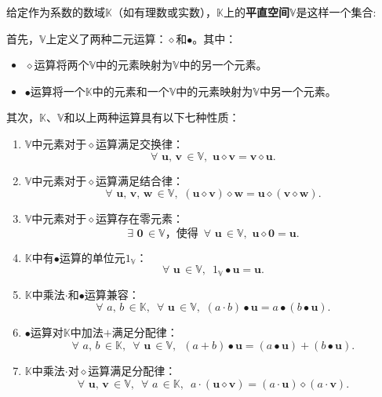 \documentclass[12pt,UTF8]{ctexbook}
\begin{document}
\begin{df}
    给定作为系数的数域$\mathbb{K}$（如有理数或实数），$\mathbb{K}$上的\textbf{平直空间}$\mathbb{V}$是这样一个集合:

    首先，$\mathbb{V}$上定义了两种二元运算：$\diamond$和$\bullet$。其中：
    \begin{itemize}
        \item $\diamond$运算将两个$\mathbb{V}$中的元素映射为$\mathbb{V}$中的另一个元素。
        \item $\bullet$运算将一个$\mathbb{K}$中的元素和一个$\mathbb{V}$中的元素映射为$\mathbb{V}$中另一个元素。
    \end{itemize}
    其次，$\mathbb{K}$、$\mathbb{V}$和以上两种运算具有以下七种性质：
    \begin{enumerate}
        \item $\mathbb{V}$中元素对于$\diamond$运算满足交换律：
        $$\forall \,\, \mathbf{u}, \, \mathbf{v} \, \in \mathbb{V}, \,\, \mathbf{u} \diamond \mathbf{v} = \mathbf{v} \diamond \mathbf{u}.$$
        \item $\mathbb{V}$中元素对于$\diamond$运算满足结合律：
        $$\forall \,\, \mathbf{u}, \, \mathbf{v}, \, \mathbf{w} \, \in \mathbb{V}, \,\, (\mathbf{u} \diamond \mathbf{v}) \diamond \mathbf{w} = \mathbf{u} \diamond (\mathbf{v} \diamond \mathbf{w}).$$
        \item $\mathbb{V}$中元素对于$\diamond$运算存在零元素：
        $$\exists \,\, \mathbf{0} \, \in \mathbb{V} \mbox{，使得}\,\,\, \forall \,\, \mathbf{u} \, \in \mathbb{V}, \,\, \mathbf{u} \diamond \mathbf{0} = \mathbf{u}.$$
        \item $\mathbb{K}$中有$\bullet$运算的单位元$1_{\mathbb{V}}$：
        $$\forall \,\, \mathbf{u} \, \in \mathbb{V}, \,\,\, 1_{\mathbb{V}} \bullet \mathbf{u} = \mathbf{u}. $$
        \item $\mathbb{K}$中乘法$\cdot$和$\bullet$运算兼容：
        $$\forall \,\, a, \, b \, \in \mathbb{K}, \,\,\, \forall \,\, \mathbf{u} \, \in \mathbb{V}, \,\, (a \cdot b)\bullet\mathbf{u} = a \bullet (b\bullet\mathbf{u}).$$
        \item $\bullet$运算对$\mathbb{K}$中加法$+$满足分配律：
        $$\forall \,\, a, \, b \, \in \mathbb{K}, \,\,\, \forall \,\, \mathbf{u} \, \in \mathbb{V}, \,\,\, (a + b)\bullet\mathbf{u} = (a \bullet \mathbf{u}) + (b \bullet \mathbf{u}). $$
        \item $\mathbb{K}$中乘法$\cdot$对$\diamond$运算满足分配律：
        $$\forall \,\, \mathbf{u}, \, \mathbf{v} \, \in \mathbb{V}, \,\,\, \forall \,\, a \, \in \mathbb{K}, \,\,\, a\cdot(\mathbf{u} \diamond \mathbf{v}) = (a \cdot \mathbf{u}) \diamond (a \cdot \mathbf{v}). $$
    \end{enumerate}
\end{df}
\end{document}
